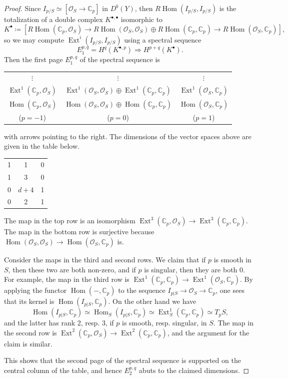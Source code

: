 \documentclass[11pt]{amsart}
\theoremstyle{definition}
\newcommand{\C}{\mathbb{C}}
\DeclareMathOperator{\Hom}{Hom}
\DeclareMathOperator{\Ext}{Ext}
\newcommand{\sO}{\mathcal{O}}
\begin{document}
\begin{proof}
Since $I_{p/S}\simeq[\sO_S\rightarrow \C_p]$ in $D^b(Y)$, then 
$R\Hom( I_{p/S},I_{p/S})$ is the totalization of a double complex $K^{\bullet,\bullet}$ isomorphic to 
$$K^\bullet\coloneqq \left[R\Hom(\C_p,\sO_S)\rightarrow R\Hom(\sO_S,\sO_S)\oplus R\Hom(\C_p,\C_p)\rightarrow R\Hom(\sO_S,\C_p)\right],$$ so we may compute $\Ext^i( I_{p/S},I_{p/S})$ using a spectral sequence
$$E_1^{p,q}=H^q(K^{\bullet,p})\Rightarrow H^{p+q}(K^\bullet).$$
Then the first page $E^{p,q}_1$ of the spectral sequence is

\begin{center}
\begin{tabular}{c|cc}
$\vdots$ & $\vdots$ & $\vdots$\\
 $\Ext^1(\C_p,\sO_S)$ & $\Ext^1(\sO_S,\sO_S)\oplus \Ext^1(\C_p,\C_p)$ &$\Ext^1(\sO_S,\C_p)$\\
$\Hom(\C_p,\sO_S)$ & $\Hom(\sO_S,\sO_S)\oplus \Hom(\C_p,\C_p)$ &$\Hom(\sO_S,\C_p)$\\
\hline
($p=-1$)&($p=0$)&($p=1$)
\end{tabular} 
\end{center}
with arrows pointing to the right. The dimensions of the vector spaces above are given in the table below.
\begin{center}
\begin{tabular}{c|cc}
1 & 1 &0\\
1 & 3 &0\\
0 & $d+4$ &1\\
0 & 2 &1\\
\hline
\end{tabular}
\end{center}
The map in the top row is an isomorphism $\Ext^3(\C_p,\sO_S)\rightarrow \Ext^3(\C_p,\C_p)$. The map in the bottom row is  surjective because $\Hom(\sO_S,\sO_S)\rightarrow \Hom(\sO_S,\C_p)$ is.

Consider the maps in the third and second rows. We claim that if $p$ is smooth in $S$, then these two are both non-zero, and if $p$ is singular, then they are both $0$. 
For example, the map in the third row is $\Ext^1(\C_p,\C_p)\rightarrow \Ext^1(\sO_S,\C_p)$. By applying the functor $\Hom(-,\C_p)$ to the sequence $I_{p|S} \to \sO_S \to\C_p$, one sees that its kernel is $\Hom(I_{p|S},\C_p)$. On the other hand we have 
\[ \Hom(I_{p|S},\C_p)\simeq \Hom_S(I_{p|S},\C_p)\simeq \Ext^1_S(\C_p,\C_p)\simeq T_p S,\]
and the latter has rank 2, resp. 3, if $p$ is smooth, resp. singular, in $S$.
The map in the second row is $\Ext^2(\C_p,\sO_S)\to \Ext^2(\C_p,\C_p)$, and the argument for the claim is similar.

This shows that the second page of the spectral sequence is supported on the central column of the table, and hence $E_2^{p,q}$ abuts to the claimed dimensions.
\end{proof}
\end{document}

